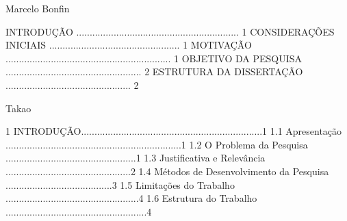 Marcelo Bonfin

INTRODUÇÃO ............................................................. 1
CONSIDERAÇÕES INICIAIS ................................................. 1
MOTIVAÇÃO .............................................................. 1
OBJETIVO DA PESQUISA ................................................... 2
ESTRUTURA DA DISSERTAÇÃO ............................................... 2





Takao

1 INTRODUÇÃO....................................................................1
1.1 Apresentação ..................................................................1
1.2 O Problema da Pesquisa .................................................1
1.3 Justificativa e Relevância ...............................................2
1.4 Métodos de Desenvolvimento da Pesquisa ........................................3
1.5 Limitações do Trabalho ..................................................4
1.6 Estrutura do Trabalho .....................................................4

